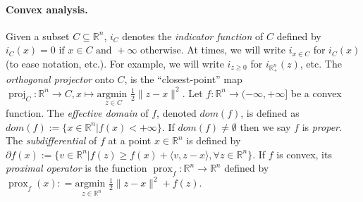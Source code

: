 \documentclass[a4paper,9pt]{extarticle}
\DeclareMathOperator{\proj}{proj}
\DeclareMathOperator{\prox}{prox}
\begin{document}
\paragraph*{Convex analysis.} %
Given a subset $C \subseteq \mathbb{R}^n$, $i_C$ denotes the
\textit{indicator function} of $C$ defined by $i_C(x) = 0 \text{ if }
x \in C\text{ and }+\infty\text{ otherwise}$.
At times, we will write $i_{x \in C}$ for $i_C(x)$ (to ease notation,
etc.). For example, we will write $i_{z \ge 0}$ for
$i_{\mathbb{R}^n_+}(z)$, etc.  The \textit{orthogonal projector} onto
$C$, is the ``closest-point'' map $\proj_C: \mathbb{R}^n \rightarrow
C, x \mapsto \underset{z \in C}{\text{argmin }}\frac{1}{2}\|z-x\|^2$.
Let $f : \mathbb{R}^n \rightarrow (-\infty, +\infty]$ be a
  convex function. The \textit{effective domain} of $f$, denoted
  $dom(f)$, is defined as
$dom(f) := \{x \in \mathbb{R}^n | f(x) < +\infty\}$.
 If $dom(f) \ne \emptyset$ then we say $f$ is \textit{proper}.
The \textit{subdifferential} of $f$ at a point $x \in \mathbb{R}^n$ is
defined by
$\partial f(x) := \{v \in \mathbb{R}^n | f(z)  \ge f(x) + \langle v, z -
x\rangle, \forall z \in \mathbb{R}^n\}$.
If $f$ is convex, its
\textit{proximal operator} is the function $\prox_f: \mathbb{R}^n
\rightarrow \mathbb{R}^n$ defined by $\prox_f(x): = \underset{z \in
  \mathbb{R}^n}{\text{argmin }}\frac{1}{2}\|z
  - x\|^2 + f(z)$.
\end{document}
